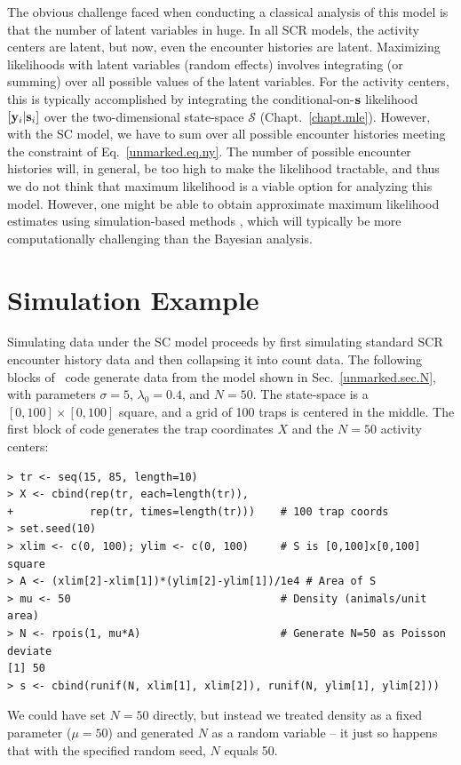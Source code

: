 The obvious challenge faced when conducting a classical analysis of
this model is that the number of latent variables in huge. In all SCR models, the activity centers are
latent, but now, even the encounter histories are latent.
Maximizing likelihoods with latent variables (random effects) involves
integrating (or summing) over all possible values of the latent
variables. For the activity centers, this is typically accomplished by
integrating the conditional-on-$\bf s$ likelihood $[{\bf y}_i|{\bf s}_i]$ over the two-dimensional
state-space $\mathcal{S}$ (Chapt.~\ref{chapt.mle}). However, with
the SC model, we have to sum
over all possible encounter histories %
meeting the
constraint of Eq.~\ref{unmarked.eq.ny}. The
number of possible encounter histories
will, in general, be too high to make the likelihood tractable,
and thus we do not think that maximum likelihood is a viable option
for analyzing this model. However, one might be able to obtain
approximate maximum
likelihood estimates using simulation-based methods
\citep{lele_etal:2010},
which will typically be more computationally
challenging than the Bayesian analysis.

\section{Simulation Example}

Simulating data under the SC model proceeds by first simulating
standard SCR encounter history data and then collapsing it into count
data. The following blocks of \R~code generate data from
the model shown in Sec.~\ref{unmarked.sec.N}, with parameters
$\sigma=5$, $\lambda_0=0.4$, and $N=50$. The state-space is a
$[0, 100] \times [0, 100]$ square, and a grid of 100 traps
is centered in the middle. 
The first block of code generates the trap coordinates
$X$ and the $N=50$ activity centers:
\begin{small}
\begin{verbatim}
> tr <- seq(15, 85, length=10)
> X <- cbind(rep(tr, each=length(tr)),
+            rep(tr, times=length(tr)))    # 100 trap coords
> set.seed(10)
> xlim <- c(0, 100); ylim <- c(0, 100)     # S is [0,100]x[0,100] square
> A <- (xlim[2]-xlim[1])*(ylim[2]-ylim[1])/1e4 # Area of S
> mu <- 50                                 # Density (animals/unit area)
> N <- rpois(1, mu*A)                      # Generate N=50 as Poisson deviate
[1] 50
> s <- cbind(runif(N, xlim[1], xlim[2]), runif(N, ylim[1], ylim[2]))
\end{verbatim}
\end{small}
We could have set $N=50$ directly, but instead we treated density
as a fixed parameter ($\mu=50$) and generated $N$ as a random
variable -- it just so happens that with the specified random seed,
$N$ equals 50. %

